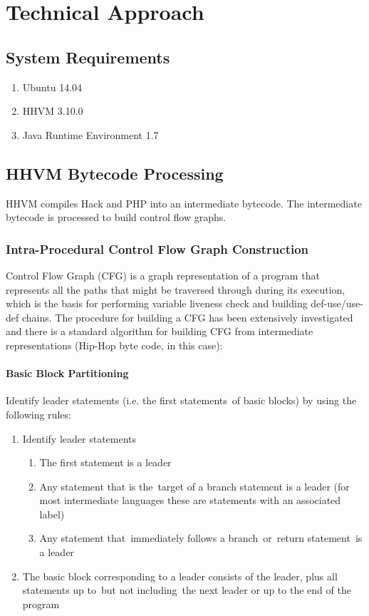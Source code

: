 \chapter{Technical Approach}

\section{System Requirements}

\begin{enumerate}
\item Ubuntu 14.04
\item HHVM 3.10.0
\item Java Runtime Environment 1.7
\end{enumerate}

\section{HHVM Bytecode Processing}
HHVM compiles Hack and PHP into an intermediate bytecode. The intermediate bytecode is processed to build control flow graphs.

\subsection{Intra-Procedural Control Flow Graph Construction}
Control Flow Graph (CFG) is a graph representation of a program that represents all the paths that might be traversed through during its execution, which is the basis for performing variable liveness check and building def-use/use-def chains. The procedure for building a CFG has been extensively investigated and there is a standard algorithm for building CFG from intermediate representations (Hip-Hop byte code, in this case):

\subsubsection{Basic Block Partitioning}
Identify leader statements (i.e. the first statements of basic blocks) by using the following rules:

\begin{enumerate}
\item Identify leader statements
\begin{enumerate}
\item The first statement is a leader
\item Any statement that is the target of a branch statement is a leader (for most intermediate languages these are statements with an associated label)
\item  Any statement that immediately follows a branch or return statement is a leader
\end{enumerate}
\item The basic block corresponding to a leader consists of the leader, plus all statements up to but not including the next leader or up to the end of the program
\end{enumerate}

